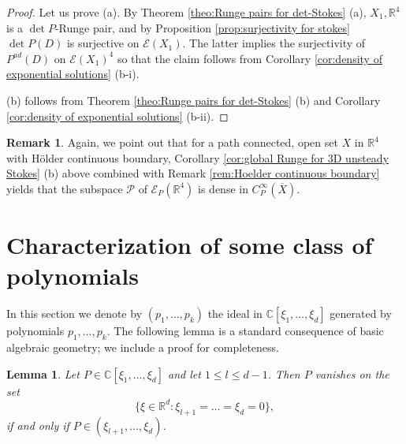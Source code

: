 \documentclass[a4paper,10pt]{amsart}
\newtheorem{lemma}[theorem]{Lemma}
\newtheorem*{crucial lemma}{Lemma \ref{lem:nice polynomial2}}
\theoremstyle{definition}
\newtheorem{remark}[theorem]{Remark}
\newcommand{\R}{\mathbb{R}}
\newcommand{\C}{\mathbb{C}}
\newcommand{\Pad}{P^{ad}}
\newcommand{\detP}{\operatorname{det}\!P}
\begin{document}
\begin{proof}
	Let us prove (a). By Theorem \ref{theo:Runge pairs for det-Stokes} (a), $X_1, \R^4$ is a $\detP$-Runge pair, and by Proposition \ref{prop:surjectivity for stokes} $\detP(D)$ is surjective on $\mathscr{E}(X_1)$. The latter implies the surjectivity of $\Pad(D)$ on $\mathscr{E}(X_1)^4$ so that the claim follows from Corollary \ref{cor:density of exponential solutions} (b-i). 
	
	(b) follows from Theorem \ref{theo:Runge pairs for det-Stokes} (b) and Corollary \ref{cor:density of exponential solutions} (b-ii).
\end{proof}

\begin{remark}\label{rem:Stokes for path connected sets with Hoelder continuous boundary}
    Again, we point out that for a path connected, open set $X$ in $\R^4$ with H\"older continuous boundary, Corollary \ref{cor:global Runge for 3D unsteady Stokes} (b) above combined with Remark \ref{rem:Hoelder continuous boundary} yields that the subspace $\mathcal{P}$ of $\mathscr{E}_P(\R^4)$ is dense in $C^\infty_{P}(\overline{X})$. 
\end{remark}

\appendix
\renewcommand{\thesection}{\arabic{section}}
\section{Characterization of some class of polynomials}\label{appendix: characterization of some polynomials}

In this section we denote by $(p_1,\ldots,p_k)$ the ideal in $\C[\xi_1,\ldots,\xi_d]$ generated by polynomials $p_1,\ldots,p_k$.
The following lemma is a standard consequence of basic algebraic geometry; we include a proof for completeness. 
\begin{lemma}\label{lem:hilbert nullstellensatz}
Let $P\in\C[\xi_1,\ldots,\xi_d]$ and let $1\leq l\leq d-1$. Then $P$ vanishes on the set 
\[\{\xi\in\R^d\colon \xi_{l+1}=\ldots=\xi_d=0\},\]
if and only if $P\in (\xi_{l+1},\ldots,\xi_d)$.

\end{lemma}
\end{document}

